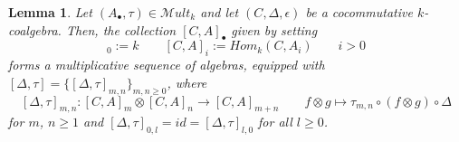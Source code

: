\documentclass[10pt, colorlinks]{article}
\numberwithin{equation}{section} \DeclareMathSizes{2}{10}{12}{13}
\newtheorem{lem}[thm]{Lemma}
\begin{document}
     
    \begin{lem}\label{lem3.3}
        Let $(A_\bullet,\tau) \in \mathscr{M}ult_k$ and let $(C,\Delta,\epsilon)$ be a cocommutative $k$-coalgebra. Then, the collection $[C, A]_\bullet$ given by setting
        \begin{equation}
        [C,A]_0:=k \qquad [C,A]_i:=Hom_k(C,A_i)\qquad i>0
        \end{equation} forms a multiplicative sequence of algebras, equipped with $[\Delta,\tau]=\{[\Delta,\tau]_{m,n}\}_{m,n\geq 0}$, where
        \begin{equation}\label{3.8yg}
            [\Delta,\tau]_{m,n}: [C,A]_m\otimes  [C,A]_n\longrightarrow [C,A]_{m+n} \qquad f\otimes g\longmapsto \tau_{m,n}\circ (f\otimes g)\circ \Delta
        \end{equation}
     for $m$, $n\geq 1$ and $[\Delta,\tau]_{0,l}=id=[\Delta,\tau]_{l,0}$ for all $l\geq 0$. 
    \end{lem}
\end{document}
